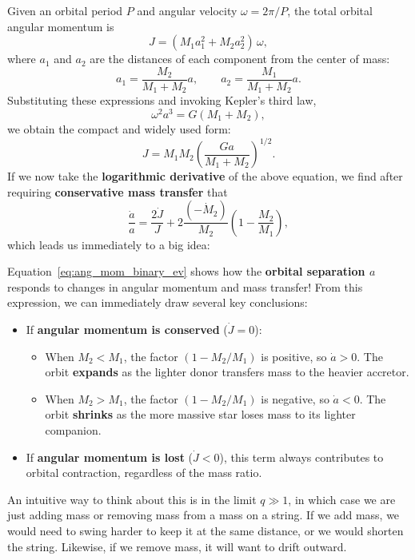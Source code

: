 Given an orbital period $P$ and angular velocity $\omega = 2\pi / P$, the total orbital angular momentum is
\[
J = (M_1 a_1^2 + M_2 a_2^2)\,\omega,
\]
where $a_1$ and $a_2$ are the distances of each component from the center of mass:
\[
a_1 = \frac{M_2}{M_1 + M_2}a,
\qquad
a_2 = \frac{M_1}{M_1 + M_2}a.
\]
Substituting these expressions and invoking Kepler’s third law,
\[
\omega^2 a^3 = G(M_1 + M_2),
\]
we obtain the compact and widely used form:
\[
\boxed{
J = M_1 M_2 \left(\frac{G a}{M_1 + M_2}\right)^{1/2}.
}
\]
If we now take the \textbf{logarithmic derivative} of the above equation, we find after requiring \textbf{conservative mass transfer} that
\begin{equation}
    \label{eq:ang_mom_binary_ev}
\frac{\dot{a}}{a} = \frac{2\dot{J}}{J}
    + 2\frac{(-\dot{M}_2)}{M_2}\left(1 - \frac{M_2}{M_1}\right),
\end{equation}
which leads us immediately to a big idea:
\begin{bigidea}

Equation~\eqref{eq:ang_mom_binary_ev} shows how the \textbf{orbital separation $a$} responds to changes in angular momentum and mass transfer! From this expression, we can immediately draw several key conclusions:
\begin{itemize}
    \item If \textbf{angular momentum is conserved} ($\dot{J}=0$):
    \begin{itemize}
        \item When $M_2 < M_1$, the factor $(1 - M_2/M_1)$ is positive, so $\dot{a} > 0$.  
        The orbit \textbf{expands} as the lighter donor transfers mass to the heavier accretor.
        \item When $M_2 > M_1$, the factor $(1 - M_2/M_1)$ is negative, so $\dot{a} < 0$.  
        The orbit \textbf{shrinks} as the more massive star loses mass to its lighter companion.
    \end{itemize}
    \item If \textbf{angular momentum is lost} ($\dot{J}<0$), this term always contributes to orbital contraction, regardless of the mass ratio.  
\end{itemize}
An intuitive way to think about this is in the limit $q \gg 1$, in which case we are just adding mass or removing mass from a mass on a string. If we add mass, we would need to swing harder
to keep it at the same distance, or we would shorten the string. Likewise, if we remove mass, it will want to drift outward.
\end{bigidea}

